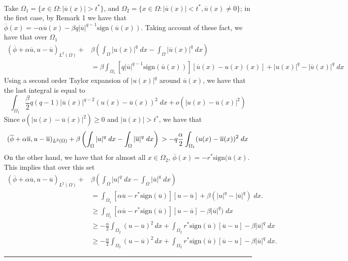 \documentclass[11pt,a4paper]{amsart}
\newcommand{\kw}{\rule{2mm}{2mm}}
\newcommand{\om}{\Omega}
\newcommand{\sign}{\mathrm{sign}}
\renewenvironment{proof}{{Proof.}}{\hfill\kw}
\begin{document}
\begin{proof}
\begin{align*}
    \end{align*}
    Take $\om_1=\{x\in \om: |\overline{u}(x)|>t^*\}$, and $\om_2=\{x\in \om: |\overline{u}(x)|<t^*, \overline{u}(x)\ne 0\}$; in the first case, by Remark 1 we have that $\overline{\phi}(x)=-\alpha\overline{u}(x)-\beta q|\overline{u}|^{q-1}\sign(\overline{u}(x))$. Taking account of these fact, we have that over $\om_1$
    \begin{align*}
        (\overline{\phi}+\alpha \overline{u},u-\overline{u})_{L^2(\Omega)}+&\beta\left(\int_{\Omega}|u(x)|^q\; dx-\int_{\om}|\overline{u}(x)|^q\; dx\right)\\
        &=\beta\int_{\om_1}[q|\overline{u}|^{q-1}\sign(\overline{u}(x))][\overline{u}(x)-u(x)(x)]+|u(x)|^q-|\overline{u}(x)|^q\; dx
    \end{align*}
    Using a second order Taylor expansion of $|{u}(x)|^q$ around $\overline{u}(x)$, we have that the last integral is equal to
    \[
    \int_{\om_1}\frac{\beta}{2}q(q-1)|\overline{u}(x)|^{q-2}(u(x)-\overline{u}(x))^2\; dx+o(|u(x)-\overline{u}(x)|^2)
    \]
    Since $o(|u(x)-\overline{u}(x)|^2)\ge 0$ and $|\overline{u}(x)|>t^*$, we have that
    \begin{equation}\label{om1}
        (\overline{\phi}+\alpha \overline{u},u-\overline{u})_{L^2(\Omega)}+\beta\left(\int_{\Omega}|u|^q\; dx-\int_{\om}|\overline{u}|^q\; dx\right)\\>-q\frac{\alpha}{2}\int_{\om_1}(u(x)-\overline{u}(x))^2\; dx
    \end{equation}
    On the other hand, we have that for almost all $x\in \om_2$, $\overline{\phi}(x)=-r^*\sign(\overline{u}(x)$. This implies that over this set
    \begin{align*}
        (\overline{\phi}+\alpha \overline{u},u-\overline{u})_{L^2(\Omega)}+&\beta\left(\int_{\Omega}|u|^q\; dx-\int_{\om}|\overline{u}|^q\; dx\right)\\
        &=\int_{\om_1}[\alpha\overline{u}-r^*\sign(\overline{u})][u-\overline{u}]+\beta(|u|^q-|\overline{u}|^q)\; dx.\\
        &\ge \int_{\om_1}[\alpha\overline{u}-r^*\sign(\overline{u})][u-\overline{u}]-\beta|\overline{u}|^q)\; dx\\
        &\ge-\frac{\alpha}{2}\int_{\om_2}(u-\overline{u})^2 \, dx+\int_{\om_2}r^*\sign(\overline{u})[\overline{u}-u]-\beta|\overline{u}|^q\; dx\\
        &\ge -\frac{\alpha}{2}\int_{\om_2}(u-\overline{u})^2 \, dx+\int_{\om_2}r^*\sign(\overline{u})[\overline{u}-u]-\beta|\overline{u}|^q\; dx.
    \end{align*}

\end{proof}
\end{document}
